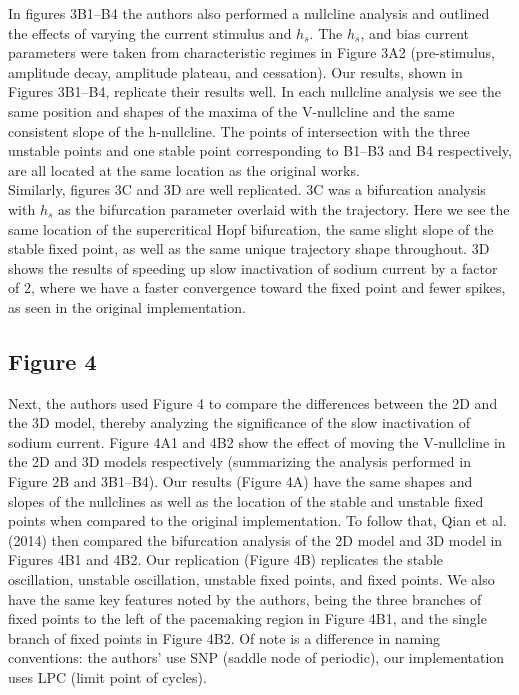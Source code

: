 In figures 3B1--B4 the authors also performed a nullcline analysis and outlined the effects of varying the current stimulus and $h_s$. The $h_s$, and bias current parameters were taken from characteristic regimes in Figure 3A2 (pre-stimulus, amplitude decay, amplitude plateau, and cessation). Our results, shown in Figures 3B1--B4, replicate their results well. In each nullcline analysis we see the same position and shapes of the maxima of the V-nullcline and the same consistent slope of the h-nullcline. The points of intersection with the three unstable points and one stable point corresponding to B1--B3 and B4 respectively, are all located at the same location as the original works. \\

Similarly, figures 3C and 3D are well replicated. 3C was a bifurcation analysis with $h_s$ as the bifurcation parameter overlaid with the trajectory. Here we see the same location of the supercritical Hopf bifurcation, the same slight slope of the stable fixed point, as well as the same unique trajectory shape throughout. 3D shows the results of speeding up slow inactivation of sodium current by a factor of 2, where we have a faster convergence toward the fixed point and fewer spikes, as seen in the original implementation.



\subsection{Figure 4}
Next, the authors used Figure 4 to compare the differences between the 2D and the 3D model, thereby analyzing the significance of the slow inactivation of sodium current. Figure 4A1 and 4B2 show the effect of moving the V-nullcline in the 2D and 3D models respectively (summarizing the analysis performed in Figure 2B and 3B1--B4). Our results (Figure 4A) have the same shapes and slopes of the nullclines as well as the location of the stable and unstable fixed points when compared to the original implementation. To follow that, Qian et al. (2014) then compared the bifurcation analysis of the 2D model and 3D model in Figures 4B1 and 4B2. Our replication (Figure 4B) replicates the stable oscillation, unstable oscillation, unstable fixed points, and fixed points. We also have the same key features noted by the authors, being the three branches of fixed points to the left of the pacemaking region in Figure 4B1, and the single branch of fixed points in Figure 4B2. Of note is a difference in naming conventions: the authors' use SNP (saddle node of periodic), our implementation uses LPC (limit point of cycles).\\

